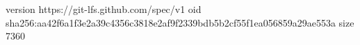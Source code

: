 version https://git-lfs.github.com/spec/v1
oid sha256:aa42f6a1f3e2a39c4356c3818e2af9f2339bdb5b2cf55f1ea056859a29ae553a
size 7360
